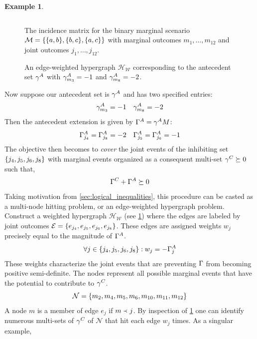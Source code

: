 \documentclass[aps, 10pt, english, twoside, pra, nofootinbib, longbibliography]{revtex4-1}
\theoremstyle{plain}
\theoremstyle{definition}
\newtheorem{example}[theorem]{Example}
\theoremstyle{remark}
\newcommand{\hgraph}{\mathcal{H}}
\newcommand{\nodes}{\mathcal{N}}
\newcommand{\weights}{\mathcal{W}}
\newcommand{\edges}{\mathcal{E}}
\newcommand{\ext}{\mathrel{\Yleft}}
\newcommand{\mscenario}{\mathcal{M}}
\newcommand{\tcdot}{} %
\begin{document}
\begin{example}
\begin{figure}
\begin{center}
\begin{minipage}[b]{.48\textwidth}
\[{                } \]
                \caption{The incidence matrix for the binary marginal scenario $\mscenario = \bc{\bc{a,b},\bc{b,c}, \bc{a,c}}$ with marginal outcomes $m_1, \ldots, m_{12}$ and joint outcomes $j_1, \ldots, j_{12}$.}
                \label{fig:compact_incidence}
            \end{minipage}\hspace{0.04\textwidth}%
            \begin{minipage}[b]{.48\textwidth}
                \centering
                \scalebox{1.0}{}
                \caption{An edge-weighted hypergraph $\hgraph_{\weights}$ corresponding to the antecedent set $\gamma^{A}$ with $\gamma^{A}_{m_3} = -1$ and $\gamma^{A}_{m_8} = -2$.}
                \label{fig:hypergraph_example}
            \end{minipage}
        \end{center}
        \end{figure}
        Now suppose our antecedent set is $\gamma^{A}$ and has two specified entries:
        \[ \gamma^{A}_{m_{3}} = -1 \quad \gamma^{A}_{m_{8}} = -2 \]
        Then the antecedent extension is given by $\Ga^{A}= \ga^{A} \tcdot M$:
        \[ \Gamma^{A}_{j_{4}} = \Gamma^{A}_{j_{8}} = -2 \quad \Gamma^{A}_{j_{5}} = \Gamma^{A}_{j_{6}} = -1 \]
        The objective then becomes to \textit{cover} the joint events of the inhibiting set $\bc{j_{4}, j_{5}, j_{6}, j_{8}}$ with marginal events organized as a consequent multi-set $\gamma^{C} \succeq 0$ such that,
        \[ \Gamma^{C} + \Gamma^{A} \succeq 0 \]
        Taking motivation from \cref{sec:logical_inequalities}, this procedure can be casted as a multi-node hitting problem, or an edge-weighted hypergraph problem. Construct a weighted hypergraph $\hgraph_{\weights}$ (see \cref{fig:hypergraph_example}) where the edges are labeled by joint outcomes $\edges = \bc{e_{j_{4}}, e_{j_{5}}, e_{j_{6}}, e_{j_{8}}}$. These edges are assigned weights $w_j$ precisely equal to the magnitude of $\Gamma^{A}$.
        \[ \forall j \in \bc{{j_{4}}, {j_{5}}, {j_{6}}, {j_{8}}} : w_{j} = - \Ga^{A}_j \]
        These weights characterize the joint events that are preventing $\Gamma$ from becoming positive semi-definite. The nodes represent all possible marginal events that have the potential to contribute to $\gamma^{C}$.
        \[ \nodes = \bc{m_2, m_4, m_5, m_6, m_{10}, m_{11}, m_{12}} \]
        A node $m$ is a member of edge $e_{j}$ if $m \ext j$. By inspection of \cref{fig:hypergraph_example} one can identify numerous multi-sets of $\gamma^{C}$ of $\nodes$ that hit each edge $w_j$ times. As a singular example,

\end{example}
\end{document}
